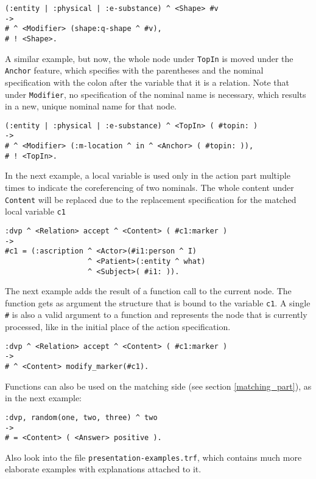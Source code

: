 \documentclass[11pt,a4paper]{article}
\newcommand{\cd}[1]{\texttt{#1}}
\begin{document}
\begin{verbatim}
(:entity | :physical | :e-substance) ^ <Shape> #v
->
# ^ <Modifier> (shape:q-shape ^ #v),
# ! <Shape>.
\end{verbatim}

A similar example, but now, the whole node under \cd{TopIn} is moved under the
\cd{Anchor} feature, which specifies with the parentheses and the nominal
specification with the colon after the variable that it is a relation.
Note that under \cd{Modifier}, no specification of the nominal name is
necessary, which results in a new, unique nominal name for that node.

\begin{verbatim}
(:entity | :physical | :e-substance) ^ <TopIn> ( #topin: )
->
# ^ <Modifier> (:m-location ^ in ^ <Anchor> ( #topin: )),
# ! <TopIn>.
\end{verbatim}

In the next example, a local variable is used only in the action part multiple
times to indicate the coreferencing of two nominals. The whole content under
\cd{Content} will be replaced due to the replacement specification for the
matched local variable \cd{c1}

\begin{verbatim}
:dvp ^ <Relation> accept ^ <Content> ( #c1:marker )
->
#c1 = (:ascription ^ <Actor>(#i1:person ^ I)
                   ^ <Patient>(:entity ^ what)
                   ^ <Subject>( #i1: )).
\end{verbatim}

The next example adds the result of a function call to the current node. The
function gets as argument the structure that is bound to the variable
\texttt{c1}. A single \texttt{\#} is also a valid argument to a function and
represents the node that is currently processed, like in the initial place of
the action specification.

\begin{verbatim}
:dvp ^ <Relation> accept ^ <Content> ( #c1:marker )
->
# ^ <Content> modify_marker(#c1).
\end{verbatim}

Functions can also be used on the matching side (see section
\ref{matching_part}), as in the next example:

\begin{verbatim}
:dvp, random(one, two, three) ^ two
->
# = <Content> ( <Answer> positive ).
\end{verbatim}

Also look into the file \texttt{presentation-examples.trf}, which contains
much more elaborate examples with explanations attached to it.
\end{document}
